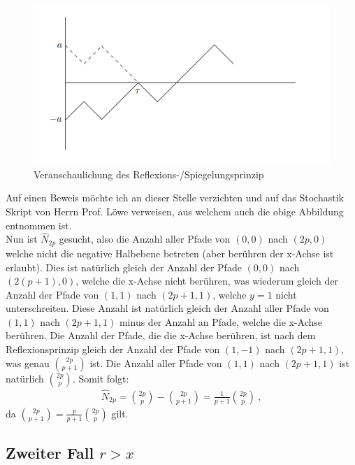 \documentclass[a4paper, 12pt]{report}
\begin{document}
\begin{figure}[H]
	\centering
	\includegraphics[scale=0.5]{spiegelungsprinzip.png}
	\caption{Veranschaulichung des Reflexions-/Spiegelungsprinzip}
\end{figure}

\noindent Auf einen Beweis möchte ich an dieser Stelle verzichten und auf das Stochastik Skript von Herrn Prof. Löwe \cite{Stoch} verweisen, aus welchem auch die obige Abbildung entnommen ist.
\\
Nun ist $\hat{N}_{2p}$ gesucht, also die Anzahl aller Pfade von $(0,0)$ nach $(2p,0)$ welche nicht die negative Halbebene betreten (aber berühren der x-Achse ist erlaubt). Dies ist natürlich gleich der Anzahl der Pfade $(0,0)$ nach $(2(p+1),0)$, welche die x-Achse nicht berühren, was wiederum gleich der Anzahl der Pfade von $(1,1)$ nach $(2p+1,1)$, welche $y=1$ nicht unterschreiten. Diese Anzahl ist natürlich gleich der Anzahl aller Pfade von $(1,1)$ nach $(2p+1,1)$ minus der Anzahl an Pfade, welche die x-Achse berühren. Die Anzahl der Pfade, die die x-Achse berühren, ist nach dem Reflexionsprinzip gleich der Anzahl der Pfade von $(1,-1)$ nach $(2p+1,1)$, was genau $2p \choose p+1$ ist. Die Anzahl aller Pfade von $(1,1)$ nach $(2p+1,1)$ ist natürlich $2p \choose p$. Somit folgt:
\begin{align}
\hat{N}_{2p}={2p \choose p} - {2p \choose p+1}=\frac{1}{p+1}{2p \choose p}\ ,
\end{align}
da ${2p \choose p+1} = \frac{p}{p+1} {2p \choose p}$ gilt.
\subsection{Zweiter Fall $r>x$}
\end{document}
